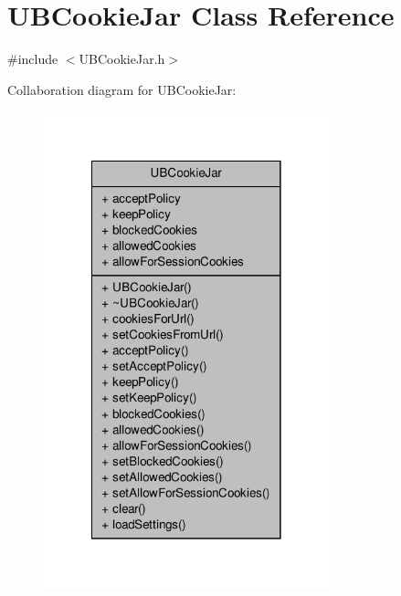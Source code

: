 \hypertarget{class_u_b_cookie_jar}{\section{U\-B\-Cookie\-Jar Class Reference}
\label{dd/d20/class_u_b_cookie_jar}
}


{\ttfamily \#include $<$U\-B\-Cookie\-Jar.\-h$>$}



Collaboration diagram for U\-B\-Cookie\-Jar\-:
\nopagebreak
\begin{figure}[H]
\begin{center}
\leavevmode
\includegraphics[width=234pt]{da/d3f/class_u_b_cookie_jar__coll__graph}
\end{center}
\end{figure}
